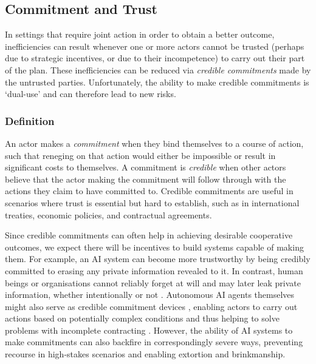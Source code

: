 \subsection{Commitment and Trust}
\label{sec:commitment_and_trust}



In settings that require joint action in order to obtain a better outcome, inefficiencies can result whenever one or more actors cannot be trusted (perhaps due to strategic incentives, or due to their incompetence) to carry out their part of the plan.
These inefficiencies can be reduced via \textit{credible commitments} made by the untrusted parties.
Unfortunately, the ability to make credible commitments is `dual-use' and can therefore lead to new risks.

\subsubsection{Definition}

An actor makes a \textit{commitment} when they bind themselves to a course of action, such that reneging on that action would either be impossible or result in significant costs to themselves. 
A commitment is \textit{credible} when other actors believe that the actor making the commitment will follow through with the actions they claim to have committed to. 
Credible commitments are useful in scenarios where trust is essential but hard to establish, such as in international treaties, economic policies, and contractual agreements.

Since credible commitments can often help in achieving desirable cooperative outcomes, we expect there will be incentives to build systems capable of making them.
For example, an AI system can become more trustworthy by being credibly committed to erasing any private information revealed to it.
In contrast, human beings or organisations cannot reliably forget at will and may later leak private information, whether intentionally or not \citep{carnegie2019disclosure}.
Autonomous AI agents themselves might also serve as credible commitment devices \citep{McAfee1984,Howard1988,tennenholtz2004program}, enabling actors to carry out actions based on potentially complex conditions and thus helping to solve problems with incomplete contracting \citep{schmitz2001hold}.
However, the ability of AI systems to make commitments can also backfire in correspondingly severe ways, preventing recourse in high-stakes scenarios and enabling extortion and brinkmanship.

